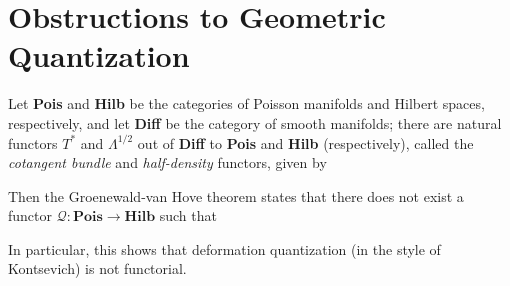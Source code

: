 \section{Obstructions to Geometric Quantization}
\begin{thrm}
Let \textbf{Pois} and \textbf{Hilb} be the categories of Poisson manifolds and Hilbert spaces, respectively, and let \textbf{Diff} be the category of smooth manifolds; there are natural functors $T^*$ and $\Lambda^{1/2}$ out of \textbf{Diff} to \textbf{Pois} and \textbf{Hilb} (respectively), called the \textit{cotangent bundle} and \textit{half-density} functors, given by
$$
$$

Then the Groenewald-van Hove theorem states that there does not exist a functor $\mathcal{Q}: \mathbf{Pois} \to \mathbf{Hilb}$ such that
$$
$$

\end{thrm}

In particular, this shows that deformation quantization (in the style of Kontsevich) is not functorial. %